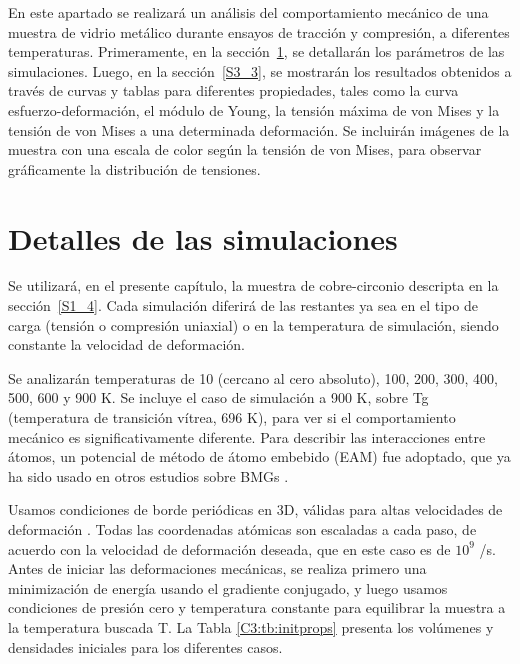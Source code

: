 En este apartado se realizará un análisis del comportamiento mecánico de una muestra de vidrio metálico durante ensayos de tracción y compresión, a diferentes temperaturas. Primeramente, en la sección~\ref{S3_2}, se detallarán los parámetros de las simulaciones. Luego, en la sección~\ref{S3_3}, se mostrarán los resultados obtenidos a través de curvas y tablas para diferentes propiedades, tales como la curva esfuerzo-deformación, el módulo de Young, la tensión máxima de von Mises y la tensión de von Mises a una determinada deformación.
Se incluirán imágenes de la muestra con una escala de color según la tensión de von Mises, para observar gráficamente la distribución de tensiones.

\section{Detalles de las simulaciones}
\label{S3_2}

Se utilizará, en el presente capítulo, la muestra de cobre-circonio descripta en la sección~\ref{S1_4}. Cada simulación diferirá de las restantes ya sea en el tipo de carga (tensión o compresión uniaxial) o en la temperatura de simulación, siendo constante la velocidad de deformación.

Se analizarán temperaturas de 10 (cercano al cero absoluto), 100, 200, 300, 400, 500, 600 y 900 K. Se incluye el caso de simulación a 900 K, sobre Tg (temperatura de transición vítrea, 696 K), para ver si el comportamiento mecánico es significativamente diferente. Para describir las interacciones entre átomos, un potencial de método de átomo embebido (EAM) \citep{daw84} fue adoptado, que ya ha sido usado en otros estudios sobre BMGs \citep{shimizu07,cao09,cheng08,arman10,cheng11,wang12}.

Usamos condiciones de borde periódicas en 3D, válidas para altas velocidades de deformación \citep{bringa05}. Todas las coordenadas atómicas son escaladas a cada paso, de acuerdo con la velocidad de deformación deseada, que en este caso es de $10^9$ /s. Antes de iniciar las deformaciones mecánicas, se realiza primero una minimización de energía usando el gradiente conjugado, y luego usamos condiciones de presión cero y temperatura constante para equilibrar la muestra a la temperatura buscada T. La Tabla \ref{C3:tb:initprops} presenta los volúmenes y densidades iniciales para los diferentes casos.

